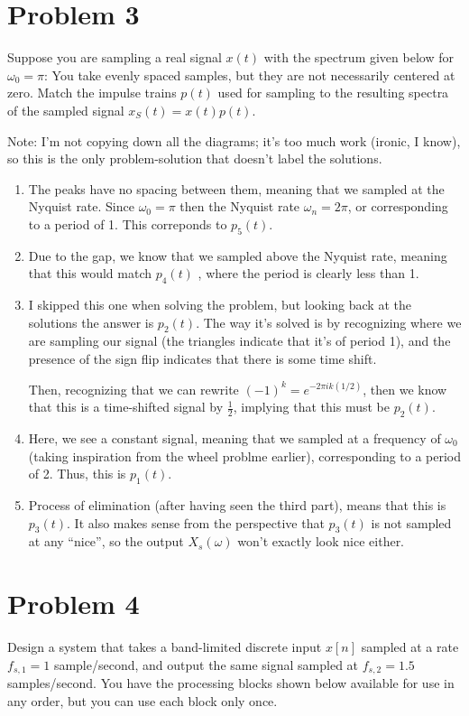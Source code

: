 \documentclass[10pt]{article}
\begin{document}
	\section*{Problem 3}
	Suppose you are sampling a real signal \( x(t) \) with the spectrum given below for \( \omega_0 = \pi \): You 
	take evenly spaced samples, but they are not necessarily centered at zero. Match the impulse trains 
	\( p(t) \) used for sampling to the resulting spectra of the sampled signal 
	\( x_S(t) = x(t) p(t) \). 

	Note: I'm not copying down all the diagrams; it's too much work (ironic, I know), so this is the only 
	problem-solution that doesn't label the solutions.  
	\begin{enumerate}[label=\alph*)]
		\item The peaks have no spacing between them, meaning that we sampled at the Nyquist rate. Since 
			\( \omega_0 = \pi \) then the Nyquist rate  \( \omega_n = 2\pi \), or corresponding to a 
			period of 1. This correponds to \( p_5(t) \). 
		\item Due to the gap, we know that we sampled above the Nyquist rate, meaning that this would match 
			\( p_4(t) \) 
			, where the period is clearly less than 1. 
		\item I skipped this one when solving the problem, but looking back at the solutions the answer
			 is \( p_2(t) \). The way it's solved is by recognizing where we are sampling our signal (the triangles 
			 indicate that it's of period 1), and the presence of the sign flip indicates that there is some 
			 time shift. 

			 Then, recognizing that we can rewrite \( (-1)^{k} = e^{- 2 \pi i k (1 / 2)} \), then we know that 
			 this is a time-shifted signal by  \( \frac{1}{2} \), implying that this must be \( p_2(t) \).
		\item Here, we see a constant signal, meaning that we sampled at a frequency of \( \omega_0 \) (taking 
			inspiration from the wheel problme earlier), 
			corresponding to a period of 2. Thus, this is \( p_1(t) \). 
		\item Process of elimination (after having seen the third part), means that this is \( p_3(t) \). It also 
			makes sense from the perspective that \( p_3(t) \) is not sampled at any ``nice'', so the output 
			\( X_s(\omega) \) won't exactly look nice either. 
	\end{enumerate}
	\pagebreak
	\section*{Problem 4}
	Design a system that takes a band-limited discrete input \( x[n] \) sampled at a rate \( f_{s, 1} = 1 \) 
	sample/second, and output the same signal sampled at \( f_{s, 2} = 1.5 \) samples/second. You have the processing
	blocks shown below available for use in any order, but you can use each block only once. 
\end{document}
